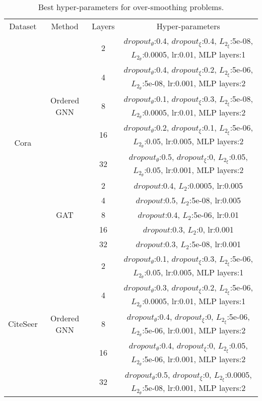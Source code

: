 \documentclass{article}
\begin{document}
\begin{table}
\caption{Best hyper-parameters for over-smoothing problems.}
\label{table.hyper.over_smoothing}
\centering
\resizebox{\textwidth}{!}
{
\begin{tabular}{cc|c|c}

\toprule
Dataset & Method & Layers & Hyper-parameters\\
\cline{1-4}

\multirow{10}{*}{Cora} & \multirow{5}{*}{Ordered GNN} & 2 & $dropout_{\theta}$:0.4, $dropout_{\xi}$:0.4, $L_{2_{\xi}}$:5e-08, $L_{2_{\theta}}$:0.0005, lr:0.01, MLP layers:1\\
\cline{3-4}
&& 4 & $dropout_{\theta}$:0.4, $dropout_{\xi}$:0.2, $L_{2_{\xi}}$:5e-06, $L_{2_{\theta}}$:5e-08, lr:0.001, MLP layers:2\\
\cline{3-4}
&& 8 & $dropout_{\theta}$:0.1, $dropout_{\xi}$:0.3, $L_{2_{\xi}}$:5e-08, $L_{2_{\theta}}$:0.0005, lr:0.01, MLP layers:2\\
\cline{3-4}
&& 16 & $dropout_{\theta}$:0.2, $dropout_{\xi}$:0.1, $L_{2_{\xi}}$:5e-06, $L_{2_{\theta}}$:0.05, lr:0.005, MLP layers:2\\
\cline{3-4}
&& 32 & $dropout_{\theta}$:0.5, $dropout_{\xi}$:0, $L_{2_{\xi}}$:0.05, $L_{2_{\theta}}$:0.05, lr:0.001, MLP layers:2\\
\cline{2-4}


& \multirow{5}{*}{GAT} & 2 & $dropout$:0.4, $L_{2}$:0.0005, lr:0.005\\
\cline{3-4}
&& 4 & $dropout$:0.5, $L_{2}$:5e-08, lr:0.005\\
\cline{3-4}
&& 8 & $dropout$:0.4, $L_{2}$:5e-06, lr:0.01\\
\cline{3-4}
&& 16 & $dropout$:0.3, $L_{2}$:0, lr:0.001\\
\cline{3-4}
&& 32 & $dropout$:0.3, $L_{2}$:5e-08, lr:0.001\\
\cline{1-4}





\multirow{10}{*}{CiteSeer} & \multirow{5}{*}{Ordered GNN} & 2 & $dropout_{\theta}$:0.1, $dropout_{\xi}$:0.3, $L_{2_{\xi}}$:5e-06, $L_{2_{\theta}}$:0.05, lr:0.005, MLP layers:1\\
\cline{3-4}
&& 4 & $dropout_{\theta}$:0.3, $dropout_{\xi}$:0.2, $L_{2_{\xi}}$:5e-06, $L_{2_{\theta}}$:0.0005, lr:0.01, MLP layers:1\\
\cline{3-4}
&& 8 & $dropout_{\theta}$:0.4, $dropout_{\xi}$:0, $L_{2_{\xi}}$:5e-06, $L_{2_{\theta}}$:5e-06, lr:0.001, MLP layers:2\\
\cline{3-4}
&& 16 & $dropout_{\theta}$:0.4, $dropout_{\xi}$:0, $L_{2_{\xi}}$:0.05, $L_{2_{\theta}}$:5e-06, lr:0.001, MLP layers:2\\
\cline{3-4}
&& 32 & $dropout_{\theta}$:0.5, $dropout_{\xi}$:0, $L_{2_{\xi}}$:0.0005, $L_{2_{\theta}}$:5e-08, lr:0.001, MLP layers:2\\
\cline{2-4}



\end{tabular}}
\end{table}
\end{document}
